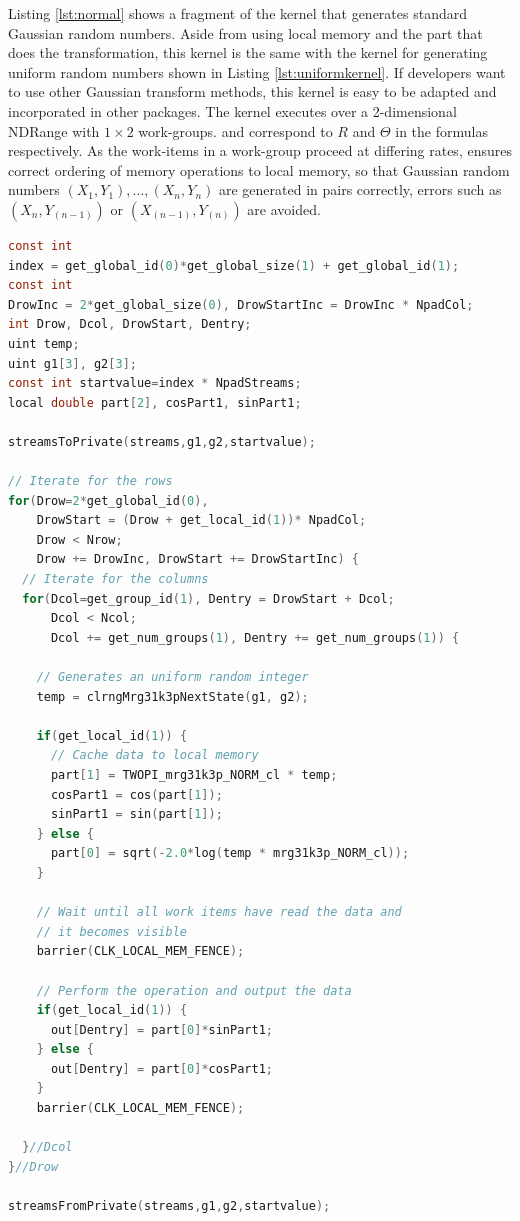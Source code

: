 \documentclass[article,nojss]{jss}\usepackage[]{graphicx}\usepackage[]{color}
\begin{document}
Listing \ref{lst:normal} shows a fragment of the kernel that generates standard Gaussian random numbers. Aside from using local memory and the part that does the transformation, this kernel is the same with the kernel for generating uniform random numbers shown in Listing \ref{lst:uniformkernel}. If developers want to use other Gaussian transform methods, this kernel is easy to be adapted and incorporated in other  packages. The kernel executes over a 2-dimensional NDRange with $1 \times 2$ work-groups.  and  correspond to $R$ and $\Theta$ in the formulas respectively. As the work-items in a work-group proceed at differing rates,  ensures correct ordering of memory operations to local memory, so that Gaussian random numbers $(X_1,Y_1), \dots, (X_n,Y_n)$ are generated in pairs correctly, errors such as $(X_n, Y_{(n-1)})$ or $(X_{(n-1)}, Y_{(n)})$ are avoided.
%
\begin{framed}
\begin{lstlisting}[language=C,basicstyle=\small,caption={name},label={lst:normal}]
const int 
index = get_global_id(0)*get_global_size(1) + get_global_id(1);
const int 
DrowInc = 2*get_global_size(0), DrowStartInc = DrowInc * NpadCol;
int Drow, Dcol, DrowStart, Dentry;
uint temp;
uint g1[3], g2[3];
const int startvalue=index * NpadStreams;
local double part[2], cosPart1, sinPart1;

streamsToPrivate(streams,g1,g2,startvalue);

// Iterate for the rows
for(Drow=2*get_global_id(0), 
    DrowStart = (Drow + get_local_id(1))* NpadCol;
    Drow < Nrow; 
    Drow += DrowInc, DrowStart += DrowStartInc) {
  // Iterate for the columns
  for(Dcol=get_group_id(1), Dentry = DrowStart + Dcol;
      Dcol < Ncol;
      Dcol += get_num_groups(1), Dentry += get_num_groups(1)) {
    
    // Generates an uniform random integer
    temp = clrngMrg31k3pNextState(g1, g2);
    
    if(get_local_id(1)) {
      // Cache data to local memory
      part[1] = TWOPI_mrg31k3p_NORM_cl * temp;
      cosPart1 = cos(part[1]);
      sinPart1 = sin(part[1]);
    } else {
      part[0] = sqrt(-2.0*log(temp * mrg31k3p_NORM_cl));
    }
    
    // Wait until all work items have read the data and 
    // it becomes visible
    barrier(CLK_LOCAL_MEM_FENCE);
    
    // Perform the operation and output the data
    if(get_local_id(1)) {
      out[Dentry] = part[0]*sinPart1;
    } else {
      out[Dentry] = part[0]*cosPart1;
    }
    barrier(CLK_LOCAL_MEM_FENCE);
    
  }//Dcol
}//Drow

streamsFromPrivate(streams,g1,g2,startvalue);
\end{lstlisting}
\end{framed}
\end{document}
